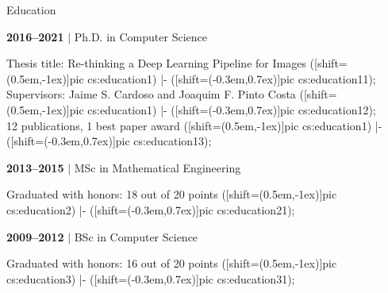 \documentclass[11pt]{article}
\begin{document}
\begin{minipage}[t]{0.40\textwidth}
\setlength{\parskip}{1em}
\centerline{\sc\large Education}

\begin{samepage}\textbf{2016--2021} $\vert$ Ph.D. in Computer Science
\\\begin{adjustwidth}{1.5em}{}%
\footnotesize
{}Thesis title: Re-thinking a Deep Learning Pipeline for Images
  ([shift={(0.5em,-1ex)}]pic cs:education1) |- ([shift={(-0.3em,0.7ex)}]pic cs:education11);\\Supervisors: Jaime S. Cardoso and Joaquim F. Pinto Costa
  ([shift={(0.5em,-1ex)}]pic cs:education1) |- ([shift={(-0.3em,0.7ex)}]pic cs:education12);\\12 publications, 1 best paper award
  ([shift={(0.5em,-1ex)}]pic cs:education1) |- ([shift={(-0.3em,0.7ex)}]pic cs:education13);\\
\end{adjustwidth}
\end{samepage}\begin{samepage}\textbf{2013--2015} $\vert$ MSc in Mathematical Engineering
\\\begin{adjustwidth}{1.5em}{}%
\footnotesize
{}Graduated with honors: 18 out of 20 points
  ([shift={(0.5em,-1ex)}]pic cs:education2) |- ([shift={(-0.3em,0.7ex)}]pic cs:education21);\\
\end{adjustwidth}
\end{samepage}\begin{samepage}\textbf{2009--2012} $\vert$ BSc in Computer Science
\\\begin{adjustwidth}{1.5em}{}%
\footnotesize
{}Graduated with honors: 16 out of 20 points
  ([shift={(0.5em,-1ex)}]pic cs:education3) |- ([shift={(-0.3em,0.7ex)}]pic cs:education31);\\
\end{adjustwidth}
\end{samepage}
\end{minipage}
\end{document}
